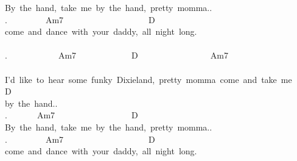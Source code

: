{By\ the\ hand,\ take\ me\ by\ the\ hand,\ pretty\ momma..\\
.\ \ \ \ \ \ \ \ \ Am7\ \ \ \ \ \ \ \ \ \ \ \ \ \ \ \ \ \ \ \ D\\
come\ and\ dance\ with\ your\ daddy,\ all\ night\ long.\ \\
\\
.\ \ \ \ \ \ \ \ \ \ \ \ Am7\ \ \ \ \ \ \ \ \ \ \ \ \ D\ \ \ \ \ \ \ \ \ \ \ \ \ \ \ \ \ Am7\ \ \ \ \ \ \ \ \ \ \ \ \ \ \ \ \ \ \ \ \ \ \ \ \ \ \ \\
I'd\ like\ to\ hear\ some\ funky\ Dixieland,\ pretty\ momma\ come\ and\ take\ me\\
D\ \ \ \ \ \ \ \ \ \ \ \ \\
by\ the\ hand..\\
.\ \ \ \ \ \ \ Am7\ \ \ \ \ \ \ \ \ \ \ \ \ \ \ \ \ \ D\\
By\ the\ hand,\ take\ me\ by\ the\ hand,\ pretty\ momma..\\
.\ \ \ \ \ \ \ \ \ Am7\ \ \ \ \ \ \ \ \ \ \ \ \ \ \ \ \ \ \ \ D\\
come\ and\ dance\ with\ your\ daddy,\ all\ night\ long.\ \\}

